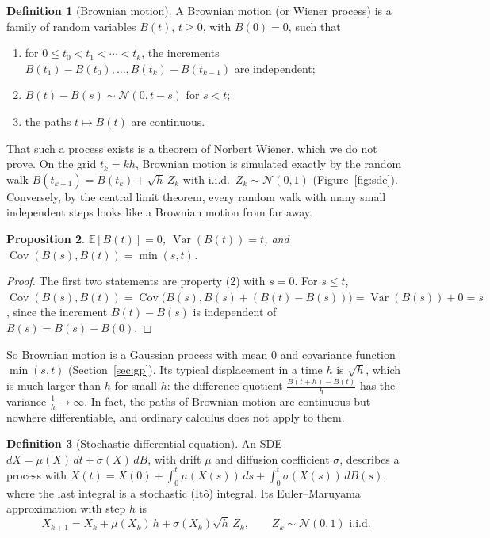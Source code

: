 \documentclass[11pt]{article}
\newcommand{\E}{\mathbb{E}}
\DeclareMathOperator{\Var}{Var}
\DeclareMathOperator{\Cov}{Cov}
\theoremstyle{definition}
\newtheorem{definition}{Definition}[section]
\theoremstyle{plain}
\newtheorem{proposition}[definition]{Proposition}
\theoremstyle{remark}
\begin{document}
\begin{definition}[Brownian motion]\label{def:brownian}
    A Brownian motion (or Wiener process) is a family of random variables $B(t)$, $t \geq 0$, with $B(0) = 0$, such that
    \begin{enumerate}
        \item for $0 \leq t_0 < t_1 < \cdots < t_k$, the increments $B(t_1) - B(t_0), \ldots, B(t_k) - B(t_{k-1})$ are independent;
        \item $B(t) - B(s) \sim \mathcal{N}(0, t - s)$ for $s < t$;
        \item the paths $t \mapsto B(t)$ are continuous.
    \end{enumerate}
\end{definition}

That such a process exists is a theorem of Norbert Wiener, which we do not prove. On the grid $t_k = kh$, Brownian motion is simulated exactly by the random walk $B(t_{k+1}) = B(t_k) + \sqrt{h}\,Z_k$ with i.i.d.\ $Z_k \sim \mathcal{N}(0, 1)$ (Figure~\ref{fig:sde}). Conversely, by the central limit theorem, every random walk with many small independent steps looks like a Brownian motion from far away.

\begin{proposition}\label{prop:brownian}
    $\E[B(t)] = 0$, $\Var(B(t)) = t$, and $\Cov(B(s), B(t)) = \min(s, t)$.
\end{proposition}

\begin{proof}
    The first two statements are property (2) with $s = 0$. For $s \leq t$, $\Cov(B(s), B(t)) = \Cov\big(B(s), B(s) + (B(t) - B(s))\big) = \Var(B(s)) + 0 = s$, since the increment $B(t) - B(s)$ is independent of $B(s) = B(s) - B(0)$.
\end{proof}

So Brownian motion is a Gaussian process with mean $0$ and covariance function $\min(s, t)$ (Section~\ref{sec:gp}). Its typical displacement in a time $h$ is $\sqrt{h}$, which is much larger than $h$ for small $h$: the difference quotient $\frac{B(t + h) - B(t)}{h}$ has the variance $\frac{1}{h} \to \infty$. In fact, the paths of Brownian motion are continuous but nowhere differentiable, and ordinary calculus does not apply to them.

\begin{definition}[Stochastic differential equation]\label{def:sde}
    An SDE $dX = \mu(X)\,dt + \sigma(X)\,dB$, with drift $\mu$ and diffusion coefficient $\sigma$, describes a process with $X(t) = X(0) + \int_0^t \mu(X(s))\, ds + \int_0^t \sigma(X(s))\, dB(s)$, where the last integral is a stochastic (It\^o) integral. Its Euler--Maruyama approximation with step $h$ is
    \[X_{k+1} = X_k + \mu(X_k)\,h + \sigma(X_k)\sqrt{h}\,Z_k, \qquad Z_k \sim \mathcal{N}(0, 1) \text{ i.i.d.}\]
\end{definition}
\end{document}
